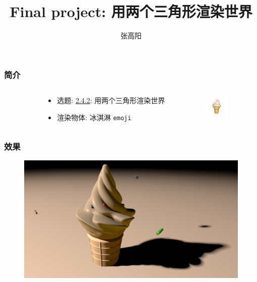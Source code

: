 \documentclass[aspectratio=169]{ctexbeamer} %
\title{Final project: 用两个三角形渲染世界}
\author{张高阳}
\begin{document}
\begin{frame}
    \titlepage 
\end{frame}

\begin{frame}
    \frametitle{简介}
    \begin{columns}
        \begin{column}{.1\textwidth}\end{column}
        \begin{column}{.5\textwidth}
            \begin{itemize}
                \item 选题: \underline{2.4.2}: 用两个三角形渲染世界
                \item 渲染物体: 冰淇淋 \texttt{emoji}
            \end{itemize}
        \end{column}
        \begin{column}{.4\textwidth}
            \includegraphics[width=32pt]{images/pre/emoji.pdf}
        \end{column}
    \end{columns}
\end{frame}

\begin{frame}
    \frametitle{效果}
    \begin{figure}[htbp]
        \centering
        \includegraphics[height=.85\textheight]{images/pre/full.pdf}
        \caption{}
        \label{fig:full}
    \end{figure}
\end{frame}
\end{document}
